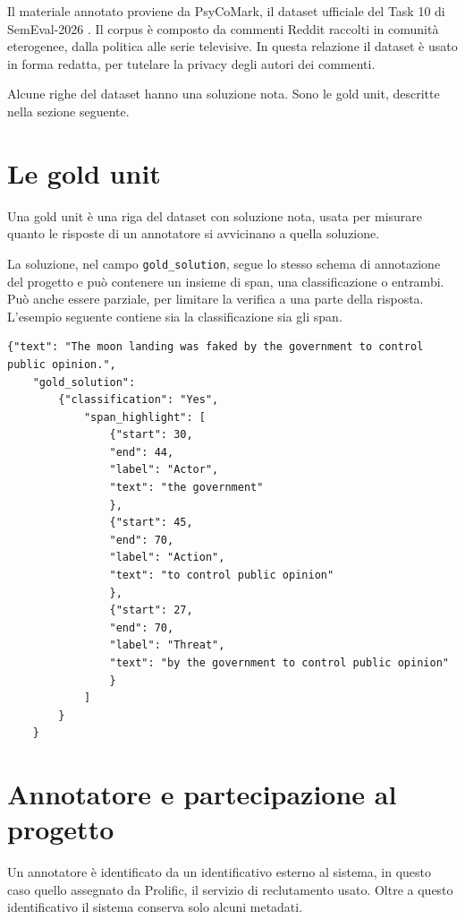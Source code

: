 \documentclass[]{sapthesis}
\begin{document}
Il materiale annotato proviene da PsyCoMark, il dataset ufficiale del Task 10 di SemEval-2026 \parencite{samory2026psycomark}. Il corpus è composto da commenti Reddit raccolti in comunità eterogenee, dalla politica alle serie televisive. In questa relazione il dataset è usato in forma redatta, per tutelare la privacy degli autori dei commenti.

Alcune righe del dataset hanno una soluzione nota. Sono le gold unit, descritte nella sezione seguente.

\section{Le gold unit}
\label{sec:goldunit}

Una gold unit è una riga del dataset con soluzione nota, usata per misurare quanto le risposte di un annotatore si avvicinano a quella soluzione.

La soluzione, nel campo \verb|gold_solution|, segue lo stesso schema di annotazione del progetto e può contenere un insieme di span, una classificazione o entrambi. Può anche essere parziale, per limitare la verifica a una parte della risposta. L'esempio seguente contiene sia la classificazione sia gli span.

\begin{lstlisting}
{"text": "The moon landing was faked by the government to control public opinion.",
    "gold_solution":
        {"classification": "Yes",
            "span_highlight": [
                {"start": 30,
                "end": 44,
                "label": "Actor",
                "text": "the government"
                },
                {"start": 45,
                "end": 70,
                "label": "Action",
                "text": "to control public opinion"
                },
                {"start": 27,
                "end": 70,
                "label": "Threat",
                "text": "by the government to control public opinion"
                }
            ]
        }
    }
\end{lstlisting}

\section{Annotatore e partecipazione al progetto}
\label{sec:annotatore}

Un annotatore è identificato da un identificativo esterno al sistema, in questo caso quello assegnato da Prolific, il servizio di reclutamento usato. Oltre a questo identificativo il sistema conserva solo alcuni metadati.
\end{document}
